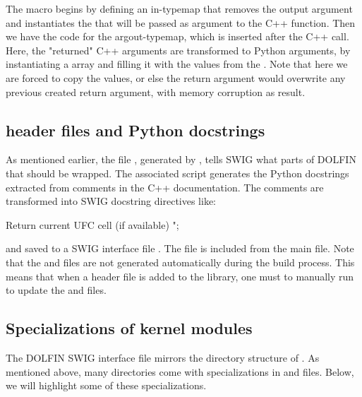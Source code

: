 The macro begins by defining an in-typemap that removes the
output argument and instantiates the  that will
be passed as argument to the C++ function. Then we have the code
for the argout-typemap, which is inserted after the C++ call. Here,
the "returned" C++ arguments are transformed to Python arguments, by
instantiating a \numpy array  and filling it with the values from
the . Note that here we are forced to copy the values,
or else the return argument would overwrite any previous created return
argument, with memory corruption as result.

\subsection{\dolfin{} header files and Python docstrings}
As mentioned earlier, the file , generated
by , tells SWIG what parts of DOLFIN that should be
wrapped.  The associated script  generates
the Python docstrings extracted from comments in the C++ documentation.
The comments are transformed into SWIG docstring directives like:
\begin{swigcode}
Return current UFC cell (if available)
";
\end{swigcode}
and saved to a SWIG interface file . The
 file is included from the main  file.
Note that the  and  files
are not generated automatically during the build process. This means
that when a header file is added to the \dolfin{} library, one must to
manually run  to update the 
and  files.


\subsection{Specializations of kernel modules}
The DOLFIN SWIG interface file  mirrors the directory
structure of \dolfin{}. As mentioned above, many directories come
with specializations in  and 
files.  Below, we will highlight some of these specializations.

